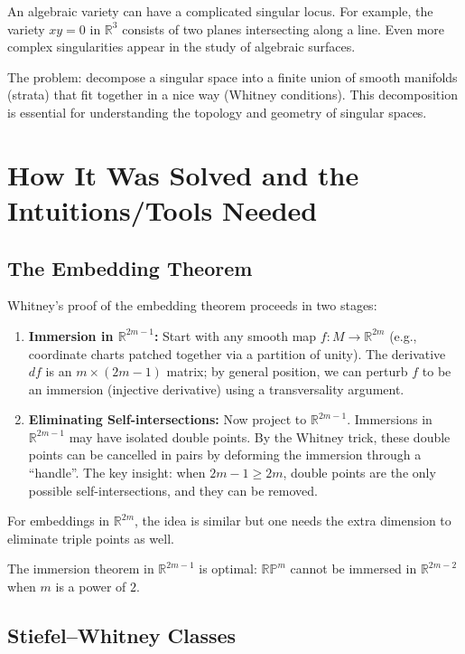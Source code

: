 An algebraic variety can have a complicated singular locus. For example, the variety $xy = 0$ in $\mathbb{R}^3$ consists of two planes intersecting along a line. Even more complex singularities appear in the study of algebraic surfaces.

The problem: decompose a singular space into a finite union of smooth manifolds (strata) that fit together in a nice way (Whitney conditions). This decomposition is essential for understanding the topology and geometry of singular spaces.

\section{How It Was Solved and the Intuitions/Tools Needed}

\subsection{The Embedding Theorem}

Whitney's proof of the embedding theorem proceeds in two stages:

\begin{enumerate}
    \item \textbf{Immersion in $\mathbb{R}^{2m-1}$:} Start with any smooth map $f: M \to \mathbb{R}^{2m}$ (e.g., coordinate charts patched together via a partition of unity). The derivative $df$ is an $m \times (2m-1)$ matrix; by general position, we can perturb $f$ to be an immersion (injective derivative) using a transversality argument.
    \item \textbf{Eliminating Self-intersections:} Now project to $\mathbb{R}^{2m-1}$. Immersions in $\mathbb{R}^{2m-1}$ may have isolated double points. By the Whitney trick, these double points can be cancelled in pairs by deforming the immersion through a ``handle''. The key insight: when $2m-1 \geq 2m$, double points are the only possible self-intersections, and they can be removed.
\end{enumerate}

For embeddings in $\mathbb{R}^{2m}$, the idea is similar but one needs the extra dimension to eliminate triple points as well.

The immersion theorem in $\mathbb{R}^{2m-1}$ is optimal: $\mathbb{RP}^m$ cannot be immersed in $\mathbb{R}^{2m-2}$ when $m$ is a power of $2$.

\subsection{Stiefel--Whitney Classes}

